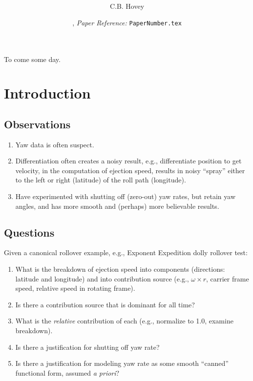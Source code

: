 \documentclass[10pt,legalpaper,twocolumn,reqno]{amsart}
\title{\bfseries \cbhTitle}
\author{C.B. Hovey}
\date{\cbhPublishDate,  {\em Paper Reference:} {\tt PaperNumber.tex}}
\begin{document}
{\abstract
To come some day.
}

\maketitle


\section{Introduction}
\subsection{Observations}
\begin{enumerate}
 \item Yaw data is often suspect.
 \item Differentiation often creates a noisy result, e.g., differentiate position to get velocity, in the 
 computation of ejection speed, results in noisy ``spray'' either to the left or right (latitude) of the
 roll path (longitude).
 \item Have experimented with shutting off (zero-out) yaw rates, but retain yaw angles, and has 
 more smooth and (perhaps) more believable results.
\end{enumerate}


\subsection{Questions}
Given a canonical rollover example, e.g., Exponent Expedition dolly rollover test:
\begin{enumerate}
 \item What is the breakdown of ejection speed into components (directions: latitude and longitude) and
 into contribution source (e.g., $\omega \times r$, carrier frame speed, relative speed in rotating frame).
 \item Is there a contribution source that is dominant for all time?
 \item What is the {\em relative} contribution of each (e.g., normalize to 1.0, examine breakdown).
 \item Is there a justification for shutting off yaw rate?
 \item Is there a justification for modeling yaw rate as some smooth ``canned'' functional form, assumed 
 {\em a priori}?
\end{enumerate}
\end{document}
